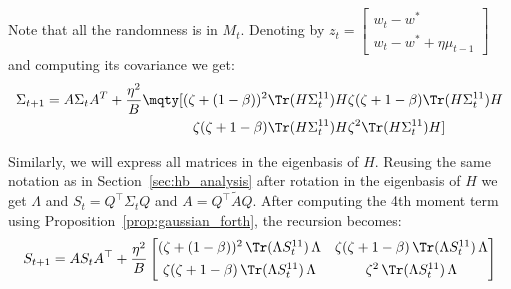 \documentclass{article}
\begin{document}
Note that all the randomness is in $M_t$. Denoting by $z_t=
\begin{bmatrix}
w_t - w^* \\
w_t - w^* + \eta \mu_{t-1}
\end{bmatrix}$ and computing its covariance we get:
\begin{align*}
    \Sigma_{t+1} = A \Sigma_t A^T + \frac{\eta^2}{B} \mqty[(\zeta + (1-\beta))^2 \Tr(H \Sigma^{11}_t)H & \zeta(\zeta + 1 - \beta) \Tr(H \Sigma^{11}_t)H \\ \zeta(\zeta + 1 - \beta) \Tr(H \Sigma^{11}_t)H & \zeta^2 \Tr(H \Sigma^{11}_t)H]
\end{align*}

Similarly, we will express all matrices in the eigenbasis of \(H\). Reusing the same notation as in Section~\ref{sec:hb_analysis}  after rotation in the eigenbasis of $H$ we get $\Lambda$ and $S_t = Q^\top\Sigma_tQ$ and $A = Q^\top \tilde{A} Q$. After computing the 4th moment term using Proposition~\ref{prop:gaussian_forth}, the recursion becomes:
\begin{equation}
S_{t+1}
=
A S_t A^\top
+
\frac{\eta^2}{B}
\begin{bmatrix}
(\zeta + (1-\beta))^2 \,\Tr(\Lambda S^{11}_{t})\, \Lambda
&
\zeta(\zeta + 1-\beta)\,\Tr(\Lambda S^{11}_{t})\, \Lambda
\\[4pt]
\zeta(\zeta + 1-\beta)\,\Tr(\Lambda S^{11}_{t})\, \Lambda
&
\zeta^2 \,\Tr(\Lambda S^{11}_{t})\, \Lambda
\end{bmatrix}
\label{eqn:st_recur_zeta}
\end{equation}
\end{document}
